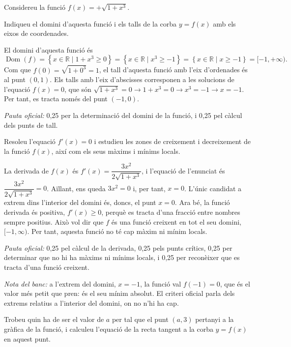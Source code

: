 Considereu la funció $f(x)=+\sqrt{1+x^3}$.

\begin{apartats}

Indiqueu el domini d'aquesta funció i els talls de la corba $y=f(x)$ amb els eixos de coordenades.

\begin{solucio}
El domini d'aquesta funció és
\[
\operatorname{Dom}(f)=\left\{x\in\mathbb{R}\mid1+x^3\ge0\right\}=\left\{x\in\mathbb{R}\mid x^3\ge-1\right\}
=\left\{x\in\mathbb{R}\mid x\ge-1\right\}=[-1,+\infty).
\]
Com que $f(0)=\sqrt{1+0^3}=1$, el tall d'aquesta funció amb l'eix d'ordenades és al punt $(0,1)$. Els talls
amb l'eix d'abscisses corresponen a les solucions de l'equació $f(x)=0$, que són
$\sqrt{1+x^3}=0\rightarrow1+x^3=0\rightarrow x^3=-1\rightarrow x=-1$. Per tant, es tracta només del punt
$(-1,0)$.

\textit{Pauta oficial:} 0,25 per la determinació del domini de la funció, i 0,25 pel càlcul dels punts de
tall.
\end{solucio}

Resoleu l'equació $f'(x)=0$ i estudieu les zones de creixement i decreixement de la funció $f(x)$, així com
els seus màxims i mínims locals.

\begin{solucio}
La derivada de $f(x)$ és $f'(x)=\dfrac{3x^2}{2\sqrt{1+x^3}}$, i l'equació de l'enunciat és
$\dfrac{3x^2}{2\sqrt{1+x^3}}=0$. Aïllant, ens queda $3x^2=0$ i, per tant, $x=0$. L'únic candidat a extrem dins
l'interior del domini és, doncs, el punt $x=0$. Ara bé, la funció derivada és positiva, $f'(x)\ge0$,
perquè es tracta d'una fracció entre nombres sempre positius. Això vol dir que $f$ és una funció creixent en
tot el seu domini, $[-1,\infty)$. Per tant, aquesta funció no té cap màxim ni mínim locals.

\textit{Pauta oficial:} 0,25 pel càlcul de la derivada, 0,25 pels punts crítics, 0,25 per determinar que no
hi ha màxims ni mínims locals, i 0,25 per reconèixer que es tracta d'una funció creixent.

\textit{Nota del banc:} a l'extrem del domini, $x=-1$, la funció val $f(-1)=0$, que és el valor més petit
que pren: és el seu mínim absolut. El criteri oficial parla dels extrems relatius a l'interior del domini,
on no n'hi ha cap.
\end{solucio}

Trobeu quin ha de ser el valor de $a$ per tal que el punt $(a,3)$ pertanyi a la gràfica de la funció, i
calculeu l'equació de la recta tangent a la corba $y=f(x)$ en aquest punt.


\end{apartats}
